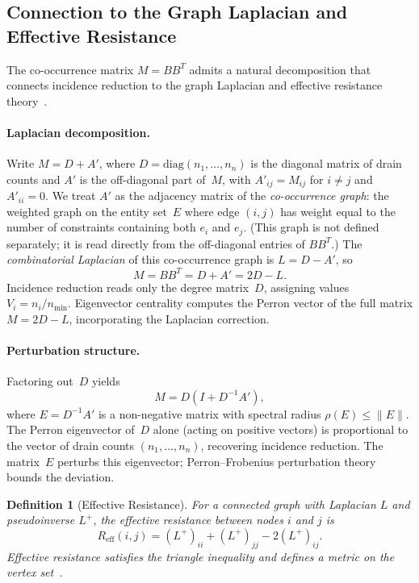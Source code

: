 \documentclass[11pt,a4paper]{article}
\newtheorem{definition}[theorem]{Definition}
\begin{document}
\subsection{Connection to the Graph Laplacian and Effective Resistance}
\label{sec:laplacian}

The co-occurrence matrix $M = BB^T$ admits a natural decomposition that connects incidence reduction to the graph Laplacian and effective resistance theory~\cite{chandra1989,klein1993,spielman2011,ghosh2008}.

\paragraph{Laplacian decomposition.}
Write $M = D + A'$, where $D = \mathrm{diag}(n_1, \ldots, n_n)$ is the diagonal matrix of drain counts and $A'$ is the off-diagonal part of~$M$, with $A'_{ij} = M_{ij}$ for $i \neq j$ and $A'_{ii} = 0$.
We treat $A'$ as the adjacency matrix of the \emph{co-occurrence graph}: the weighted graph on the entity set~$E$ where edge $(i,j)$ has weight equal to the number of constraints containing both $e_i$ and $e_j$.
(This graph is not defined separately; it is read directly from the off-diagonal entries of $BB^T$.)
The \emph{combinatorial Laplacian} of this co-occurrence graph is $L = D - A'$, so
\begin{equation}\label{eq:laplacian-decomp}
  M = BB^T = D + A' = 2D - L.
\end{equation}
Incidence reduction reads only the degree matrix~$D$, assigning values $V_i = n_i / n_{\min}$.
Eigenvector centrality computes the Perron vector of the full matrix $M = 2D - L$, incorporating the Laplacian correction.

\paragraph{Perturbation structure.}
Factoring out~$D$ yields
\begin{equation}\label{eq:perturbation}
  M = D(I + D^{-1}A'),
\end{equation}
where $E = D^{-1}A'$ is a non-negative matrix with spectral radius $\rho(E) \leq \|E\|$.
The Perron eigenvector of~$D$ alone (acting on positive vectors) is proportional to the vector of drain counts $(n_1, \ldots, n_n)$, recovering incidence reduction.
The matrix~$E$ perturbs this eigenvector; Perron--Frobenius perturbation theory bounds the deviation.

\begin{definition}[Effective Resistance]\label{def:eff-resistance}
For a connected graph with Laplacian $L$ and pseudoinverse $L^+$, the \emph{effective resistance} between nodes $i$ and $j$ is
\[
  R_{\mathrm{eff}}(i,j) = (L^+)_{ii} + (L^+)_{jj} - 2(L^+)_{ij}.
\]
Effective resistance satisfies the triangle inequality and defines a metric on the vertex set~\cite{klein1993}.
\end{definition}
\end{document}
